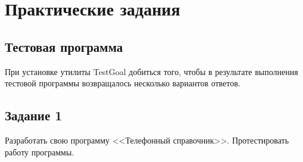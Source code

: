 \chapter{Практические задания}

\section{Тестовая программа}

При установке утилиты TestGoal добиться того, чтобы в результате выполнения
тестовой программы возвращалось несколько вариантов ответов.


\section{Задание 1}

Разработать свою программу <<Телефонный справочник>>. Протестировать работу
программы.



